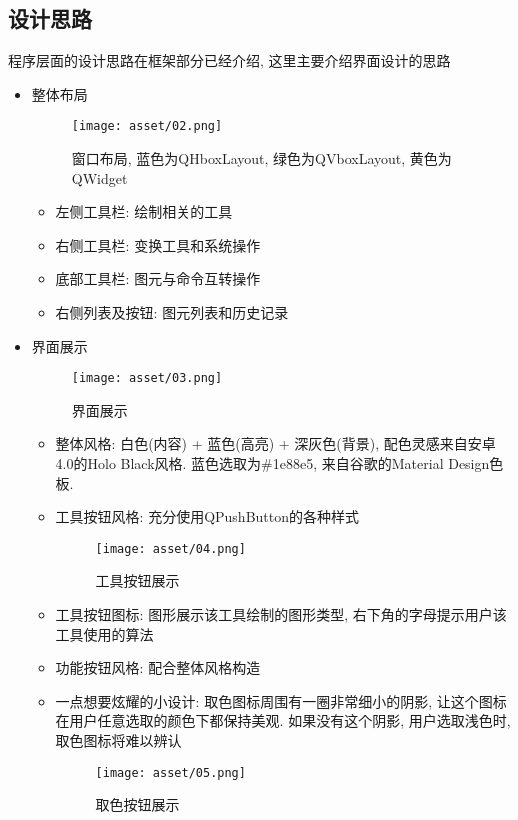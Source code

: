 \documentclass[a4paper,UTF8]{article}
\theoremstyle{definition}
\begin{document}
\subsection{设计思路}
程序层面的设计思路在框架部分已经介绍, 这里主要介绍界面设计的思路
\begin{itemize}
  \item 整体布局
  \begin{figure}[htp]
    \centering
    \texttt{[image: asset/02.png]}
    \caption{窗口布局, 蓝色为QHboxLayout, 绿色为QVboxLayout, 黄色为QWidget}
    \end{figure}
    \begin{itemize}
      \item 左侧工具栏: 绘制相关的工具
      \item 右侧工具栏: 变换工具和系统操作
      \item 底部工具栏: 图元与命令互转操作
      \item 右侧列表及按钮: 图元列表和历史记录
    \end{itemize}
  \item 界面展示
  \begin{figure}[htp]
    \centering
    \texttt{[image: asset/03.png]}
    \caption{界面展示}
    \end{figure}
    \begin{itemize}
      \item 整体风格: 白色(内容) + 蓝色(高亮) + 深灰色(背景), 配色灵感来自安卓4.0的Holo Black风格. 蓝色选取为\#1e88e5, 来自谷歌的Material Design色板. 
      \item 工具按钮风格: 充分使用QPushButton的各种样式
      \begin{figure}[htp]
        \centering
        \texttt{[image: asset/04.png]}
        \caption{工具按钮展示}
      \end{figure}
      \item 工具按钮图标: 图形展示该工具绘制的图形类型, 右下角的字母提示用户该工具使用的算法
      \item 功能按钮风格: 配合整体风格构造
      \item 一点想要炫耀的小设计: 取色图标周围有一圈非常细小的阴影, 让这个图标在用户任意选取的颜色下都保持美观. 如果没有这个阴影, 用户选取浅色时, 取色图标将难以辨认
      \begin{figure}[htp]
        \centering
        \texttt{[image: asset/05.png]}
        \caption{取色按钮展示}
      \end{figure}
    \end{itemize}
\end{itemize}
\end{document}
